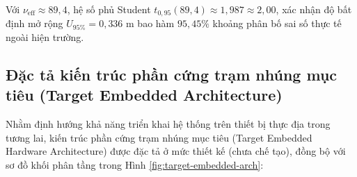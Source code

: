 Với $\nu_{\text{eff}} \approx 89{,}4$, hệ số phủ Student $t_{0{,}95}(89{,}4) \approx 1{,}987 \approx 2{,}00$, xác nhận độ bất định mở rộng $U_{95\%} = 0{,}336$ m bao hàm $95{,}45\%$ khoảng phân bố sai số thực tế ngoài hiện trường.

\subsection{Đặc tả kiến trúc phần cứng trạm nhúng mục tiêu (Target Embedded Architecture)}

\hspace{0.5cm} Nhằm định hướng khả năng triển khai hệ thống trên thiết bị thực địa trong tương lai, kiến trúc phần cứng trạm nhúng mục tiêu (Target Embedded Hardware Architecture) được đặc tả ở mức thiết kế (chưa chế tạo), đồng bộ với sơ đồ khối phân tầng trong Hình \ref{fig:target-embedded-arch}:

